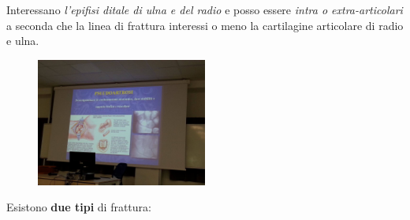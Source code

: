 Interessano \emph{l'epifisi ditale di ulna e del radio} e posso essere \emph{intra o extra-articolari} a seconda che la linea di frattura
interessi o meno la cartilagine articolare di radio e ulna.

\begin{figure}[!ht]
\centering
\includegraphics[width=0.5\textwidth]{004/image6.jpeg}
\end{figure}

Esistono \textbf{due tipi} di frattura:


